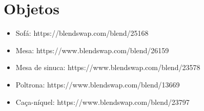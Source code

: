 \section{Objetos}
\begin{itemize}
    \item Sofá: https://blendswap.com/blend/25168
    \item Mesa: https://www.blendswap.com/blend/26159
    \item Mesa de sinuca: https://www.blendswap.com/blend/23578
    \item Poltrona: https://www.blendswap.com/blend/13669
    \item Caça-níquel: https://www.blendswap.com/blend/23797
    
    
\end{itemize}